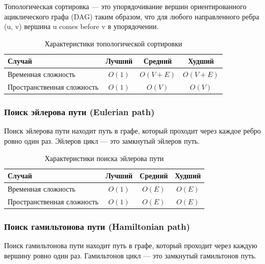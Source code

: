 \documentclass[a4paper,12pt]{article}
\begin{document}
Топологическая сортировка --- это упорядочивание вершин ориентированного ациклического графа (DAG) таким образом, что для любого направленного ребра (u, v) вершина u comes before v в упорядочении.

\begin{table}[H]
    \centering
    \begin{tabular}{|l|c|c|c|}
        \hline
        Случай & Лучший & Средний & Худший \\
        \hline
        Временная сложность & $O(1)$ & $O(V + E)$ & $O(V + E)$ \\
        \hline
        Пространственная сложность & $O(1)$ & $O(V)$ & $O(V)$ \\
        \hline
    \end{tabular}
    \caption{Характеристики топологической сортировки}
\end{table}

\subsubsection{Поиск эйлерова пути (Eulerian path)}
\label{subsubsec:поиск-эйлерова-пути-eulerian-path}

Поиск эйлерова пути находит путь в графе, который проходит через каждое ребро ровно один раз. Эйлеров цикл --- это замкнутый эйлеров путь.

\begin{table}[H]
    \centering
    \begin{tabular}{|l|c|c|c|}
        \hline
        Случай & Лучший & Средний & Худший \\
        \hline
        Временная сложность & $O(1)$ & $O(E)$ & $O(E)$ \\
        \hline
        Пространственная сложность & $O(1)$ & $O(E)$ & $O(E)$ \\
        \hline
    \end{tabular}
    \caption{Характеристики поиска эйлерова пути}
\end{table}

\subsubsection{Поиск гамильтонова пути (Hamiltonian path)}
\label{subsubsec:поиск-гамильтонова-пути-hamiltonian-path}

Поиск гамильтонова пути находит путь в графе, который проходит через каждую вершину ровно один раз. Гамильтонов цикл --- это замкнутый гамильтонов путь.
\end{document}
